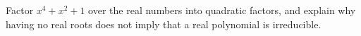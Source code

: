 Factor $x^4+x^2+1$ over the real numbers into quadratic factors, and explain why having no real roots does not imply that a real polynomial is irreducible.
